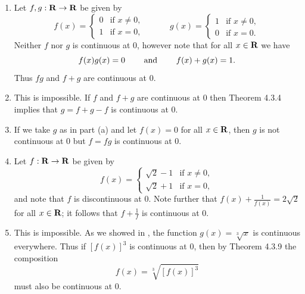 \documentclass{lew98_solutions}
\begin{document}
\begin{solution}
    \begin{enumerate}
        \item Let \( f, g : \mathbf{R} \to \mathbf{R} \) be given by
        \[
            f(x) = \begin{cases}
                0 & \text{if } x \neq 0, \\
                1 & \text{if } x = 0,
            \end{cases}
            \quad\quad\quad
            g(x) = \begin{cases}
                1 & \text{if } x \neq 0, \\
                0 & \text{if } x = 0.
            \end{cases}
        \]
        Neither \( f \) nor \( g \) is continuous at 0, however note that for all \( x \in \mathbf{R} \) we have
        \[
            f(x)g(x) = 0 \hspace{8mm} \text{and} \hspace{8mm} f(x) + g(x) = 1.
        \]
        Thus \( fg \) and \( f + g \) are continuous at 0.

        \item This is impossible. If \( f \) and \( f + g \) are continuous at 0 then Theorem 4.3.4 implies that \( g = f + g - f \) is continuous at 0.

        \item If we take \( g \) as in part (a) and let \( f(x) = 0 \) for all \( x \in \mathbf{R} \), then \( g \) is not continuous at 0 but \( f = fg \) is continuous at 0.

        \item Let \( f : \mathbf{R} \to \mathbf{R} \) be given by
        \[
            f(x) = \begin{cases}
                \sqrt{2} - 1 & \text{if } x \neq 0, \\
                \sqrt{2} + 1 & \text{if } x = 0,
            \end{cases}
        \]
        and note that \( f \) is discontinuous at 0. Note further that \( f(x) + \tfrac{1}{f(x)} = 2 \sqrt{2} \) for all \( x \in \mathbf{R} \); it follows that \( f + \tfrac{1}{f} \) is continuous at 0.

        \item This is impossible. As we showed in , the function \( g(x) = \sqrt[3]{x} \) is continuous everywhere. Thus if \( [f(x)]^3 \) is continuous at 0, then by Theorem 4.3.9 the composition
        \[
            f(x) = \sqrt[3]{[f(x)]^3}
        \]
        must also be continuous at 0.
    \end{enumerate}
\end{solution}
\end{document}
